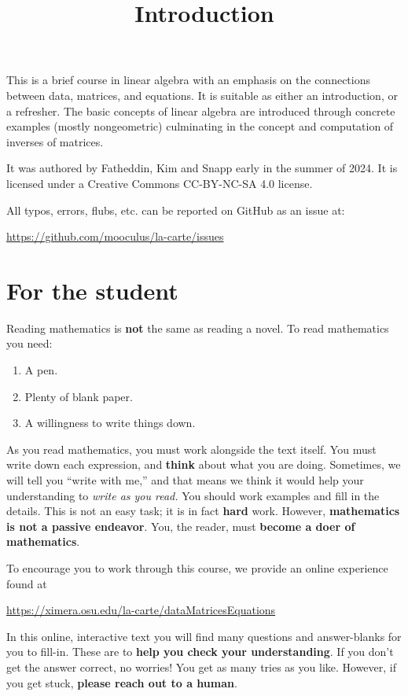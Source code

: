 \documentclass{ximera}
\title{Introduction}
\begin{document}
This is a brief course in linear algebra with an emphasis on the
connections between data, matrices, and equations. It is suitable as
either an introduction, or a refresher. The basic concepts of linear
algebra are introduced through concrete examples (mostly nongeometric)
culminating in the concept and computation of inverses of matrices.


It was authored by Fatheddin, Kim and Snapp early in the summer of
2024. It is licensed under a Creative Commons CC-BY-NC-SA 4.0 license. 



All typos, errors, flubs, etc. can be reported on GitHub as an issue at:
\begin{center}
\url{https://github.com/mooculus/la-carte/issues}
\end{center}


\section*{For the student}


Reading mathematics is \textbf{not} the same as reading a novel. To
read mathematics you need:
\begin{enumerate}
\item A pen.
\item Plenty of blank paper.
\item A willingness to write things down.
\end{enumerate}
As you read mathematics, you must work alongside the text itself. You
must write down each expression, and \textbf{think} about what you are
doing. Sometimes, we will tell you ``write with me,'' and that means
we think it would help your understanding to \textit{write as you
  read.}  You should work examples and fill in the details. This is
not an easy task; it is in fact \textbf{hard} work. However,
\textbf{mathematics is not a passive endeavor}. You, the reader, must \textbf{become a
  doer of mathematics}.


To encourage you to work through this course, we provide an online experience found at
\begin{center}
  \url{https://ximera.osu.edu/la-carte/dataMatricesEquations}
\end{center}

In this online, interactive text you will find many questions and
answer-blanks for you to fill-in. These are to \textbf{help you check
  your understanding}. If you don't get the answer correct, no
worries! You get as many tries as you like. However, if you get stuck,
\textbf{please reach out to a human}.
\end{document}

